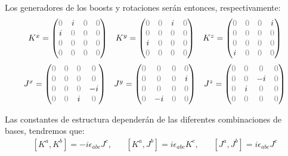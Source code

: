 \documentclass[]{report}
\numberwithin{equation}{section}
\newcommand{\0}{\textcolor{gray}{0}}
\begin{document}
Los generadores de los boosts y rotaciones serán entonces, respectivamente:
\begin{equation}
	\begin{matrix}
		K^x = \begin{pmatrix}
			\0 &i &\0 &\0\\
			i &\0 &\0 &\0\\
			\0 &\0 &\0 &\0\\
			\0 &\0 &\0 &\0
		\end{pmatrix} & 
		K^y = \begin{pmatrix}
			\0 &\0 &i &\0\\
			\0 &\0 &\0 &\0\\
			i &\0 &\0 &\0\\
			\0 &\0 &\0 &\0
		\end{pmatrix} &
		K^z = \begin{pmatrix}
			\0 &\0 &\0 &i\\
			\0 &\0 &\0 &\0\\
			\0 &\0 &\0 &\0\\
			i &\0 &\0 &\0
		\end{pmatrix}
	\end{matrix}
\end{equation}
\begin{equation}
	\begin{matrix}
		J^x = \begin{pmatrix}
			\0 &\0 &\0 &\0\\
			\0 &\0 &\0 &\0\\
			\0 &\0 &\0 &-i\\
			\0 &\0 &i &\0
		\end{pmatrix} & 
		J^y = \begin{pmatrix}
			\0 &\0 &\0 &\0\\
			\0 &\0 &\0 &i\\
			\0 &\0 &\0 &\0\\
			\0 &-i &\0 &\0
		\end{pmatrix} &
		J^z = \begin{pmatrix}
			\0 &\0 &\0 &\0\\
			\0 &\0 &-i &\0\\
			\0 &i &\0 &\0\\
			\0 &\0 &\0 &\0
		\end{pmatrix}
	\end{matrix}
\end{equation}

Las constantes de estructura dependerán de las diferentes combinaciones de bases, tendremos que:
\begin{equation}
	\begin{matrix}
		[K^a,K^b] = -i\epsilon_{abc}J^c,\ \ \ \ & [K^a,J^b] = i\epsilon_{abc}K^c,\ \ \ \ & [J^a,J^b] = i\epsilon_{abc}J^c
	\end{matrix}
\end{equation}
\end{document}
